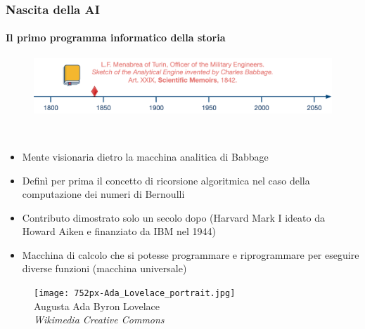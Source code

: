 \begin{frame}[t,fragile] \frametitle{Nascita della AI}
	{\scriptsize
		\onslide<1->
            \framesubtitle{Il primo programma informatico della storia}
            \vspace*{-15pt}
             \begin{minipage}[t]{\textwidth}
             	\begin{figure}[ht]
                    \centering
                    \includegraphics[width=\textwidth]{img/AI-timeline-1842-alt.png}
                \end{figure}
            \end{minipage}
            \\\vspace*{3pt}
	    	\begin{minipage}[t]{\textwidth}
				\begin{minipage}[t]{0.6\textwidth}
	    			\begin{itemize}[leftmargin=10pt,align=right]
						\onslide<2->\item[\alert{\faHandORight}] Mente visionaria dietro la \alert{macchina analitica di Babbage}
						\onslide<3->\item[\alert{\faHandORight}] Definì per prima il concetto di \alert{ricorsione algoritmica} nel caso della computazione dei numeri di Bernoulli
						\onslide<4->\item[\alert{\faHandORight}] Contributo dimostrato solo un secolo dopo (Harvard Mark I ideato da Howard Aiken e finanziato da IBM nel 1944)
						\onslide<5->\item[\alert{\faHandORight}] Macchina di calcolo che si potesse programmare e riprogrammare per eseguire diverse funzioni (\alert{macchina universale})
					\end{itemize}
            	\end{minipage}
            	\begin{minipage}[t]{0.4\textwidth}
                	\centering
                	\begin{figure}[ht]
                    	\texttt{[image: 752px-Ada\_Lovelace\_portrait.jpg]}
                    	{\tiny\\Augusta Ada Byron Lovelace\\\vspace*{-1pt}\textit{\textcopyright Wikimedia Creative Commons}}
                	\end{figure}
            	\end{minipage}
	    	\end{minipage}
	}
\end{frame}
